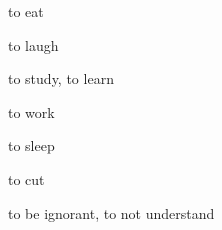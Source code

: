 \documentclass[avery5371,grid,frame]{flashcards}
\begin{document}
\begin{flashcard}{\LARGE to eat}
\LARGE {}
\end{flashcard}
\begin{flashcard}{\LARGE to laugh}
\LARGE {}
\end{flashcard}
\begin{flashcard}{\LARGE to study, to learn}
\LARGE {}
\end{flashcard}
\begin{flashcard}{\LARGE to work}
\LARGE {}
\end{flashcard}
\begin{flashcard}{\LARGE to sleep}
\LARGE {}
\end{flashcard}
\begin{flashcard}{\LARGE to cut}
\LARGE {}
\end{flashcard}
\begin{flashcard}{\LARGE to be ignorant, to not understand}
\LARGE {}
\end{flashcard}
\end{document}
